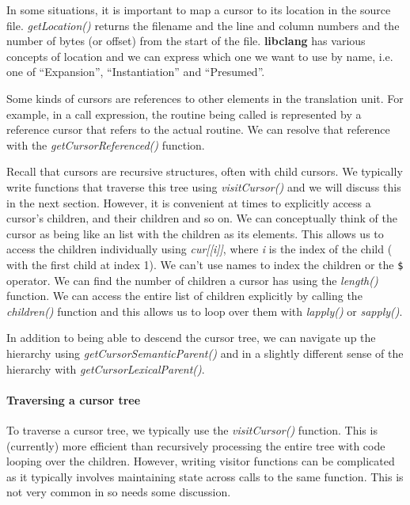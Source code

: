 \documentclass[article]{jss}
\def\R{\proglang{R}}
\def\Rfunc#1{\textsl{#1()}}
\def\Rdollar{\texttt{\$}}
\def\Rvar#1{\textsl{#1}}
\def\Rexpr#1{\textit{#1}}
\def\libclang{\textbf{libclang}}
\def\dquote#1{``#1''}
\begin{document}
In some situations, it is important to map a cursor to its location in
the source file. \Rfunc{getLocation} returns the filename and the line
and column numbers and the number of bytes (or offset) from the start
of the file. \libclang{} has various concepts of location and we can
express which one we want to use by name, i.e. one of
\dquote{Expansion}, \dquote{Instantiation} and \dquote{Presumed}.

Some kinds of cursors are references to other elements in the
translation unit. For example, in a call expression, the routine being
called is represented by a reference cursor that refers to the actual
routine. We can resolve that reference with the
\Rfunc{getCursorReferenced} function.

Recall that cursors are recursive structures, often with child cursors.  We
typically write functions that traverse this tree using
\Rfunc{visitCursor} and we will discuss this in the next section.
However, it is convenient at times to explicitly access a cursor's
children, and their children and so on.  We can conceptually think of the
cursor as being like an \R{} list with the children as its
elements. This allows us to access the children individually using
\Rexpr{cur[[i]]}, where \Rvar{i} is the index of the child ( with the
first child at index 1). We can't use names to index the children or
the \Rdollar{} operator. We can find the number of children a
cursor has using the \Rfunc{length} function.  We can access the entire list of
children explicitly by calling the \Rfunc{children} function and this allows us to loop
over them with \Rfunc{lapply} or \Rfunc{sapply}.

In addition to being able to descend the cursor tree, we can navigate
up the hierarchy using \Rfunc{getCursorSemanticParent} and in a
slightly different sense of the hierarchy with \Rfunc{getCursorLexicalParent}.


\paragraph{Traversing a cursor tree}
To traverse a cursor tree, we typically use the \Rfunc{visitCursor} function.
This is (currently) more efficient than recursively processing the
entire tree with \R{} code looping over the children. However, writing
visitor functions can be complicated as it typically involves
maintaining state across calls to the same function. This is not very
common in \R{} so needs some discussion.



\end{document}
